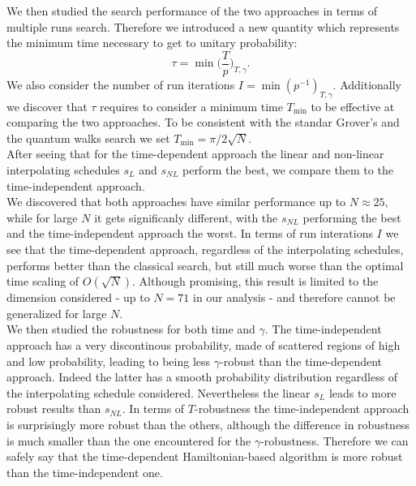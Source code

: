 \noindent
We then studied the search performance of the two approaches in terms of multiple runs search. Therefore we introduced a new quantity which represents the minimum time necessary to get to unitary probability:
\begin{equation*}
  \tau = \min\Big(\frac{T}{p}\Big)_{T,\gamma}.
\end{equation*}
We also consider the number of run iterations $I=\min(p^{-1})_{T,\gamma}$. Additionally we discover that $\tau$ requires to consider a minimum time $T_{\min}$ to be effective at comparing the two approaches. To be consistent with the standar Grover's and the quantum walks search we set $T_{\min} = \pi/2\sqrt{N}$. \\
After seeing that for the time-dependent approach the linear and non-linear interpolating schedules $s_L$ and $s_{NL}$ perform the best, we compare them to the time-independent approach.\\
We discovered that both approaches have similar performance up to $N\approx 25$, while for large $N$ it gets significanly different, with the $s_{NL}$ performing the best and the time-independent approach the worst. In terms of run interations $I$ we see that the time-dependent approach, regardless of the interpolating schedules, performs better than the classical search, but still much worse than the optimal time scaling of $O(\sqrt{N})$. Although promising, this result is limited to the dimension considered - up to $N=71$ in our analysis - and therefore cannot be generalized for large $N$. \\

\noindent
We then studied the robustness for both time and $\gamma$. The time-independent approach has a very discontinous probability, made of scattered regions of high and low probability, leading to being less $\gamma$-robust than the time-dependent approach. Indeed the latter has a smooth probability distribution regardless of the interpolating schedule considered. Nevertheless the linear $s_L$ leads to more robust results than $s_{NL}$. In terms of $T$-robustness the time-independent approach is surprisingly more robust than the others, although the difference in robustness is much smaller than the one encountered for the $\gamma$-robustness. Therefore we can safely say that the time-dependent Hamiltonian-based algorithm is more robust than the time-independent one. \\


